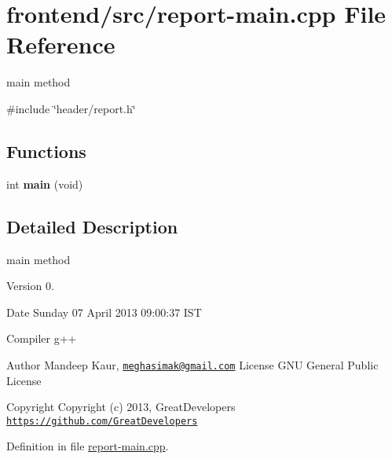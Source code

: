 \hypertarget{report-main_8cpp}{\section{frontend/src/report-\/main.cpp \-File \-Reference}
\label{dd/d5b/report-main_8cpp}
}


main method  


{\ttfamily \#include \char`\"{}header/report.\-h\char`\"{}}\*
\subsection*{\-Functions}
\begin{DoxyCompactItemize}
\item 
\hypertarget{report-main_8cpp_a840291bc02cba5474a4cb46a9b9566fe}{int {\bfseries main} (void)}\label{dd/d5b/report-main_8cpp_a840291bc02cba5474a4cb46a9b9566fe}

\end{DoxyCompactItemize}


\subsection{\-Detailed \-Description}
main method \begin{DoxyVersion}{\-Version}
0. 
\end{DoxyVersion}
\begin{DoxyDate}{\-Date}
\-Sunday 07 \-April 2013 09\-:00\-:37 \-I\-S\-T\par
 \-Compiler g++
\end{DoxyDate}
\begin{DoxyAuthor}{\-Author}
\-Mandeep \-Kaur, \href{mailto:meghasimak@gmail.com}{\tt meghasimak@gmail.\-com} \-License \-G\-N\-U \-General \-Public \-License 
\end{DoxyAuthor}
\begin{DoxyCopyright}{\-Copyright}
\-Copyright (c) 2013, \-Great\-Developers \href{https://github.com/GreatDevelopers}{\tt https\-://github.\-com/\-Great\-Developers} 
\end{DoxyCopyright}


\-Definition in file \hyperlink{report-main_8cpp_source}{report-\/main.\-cpp}.

